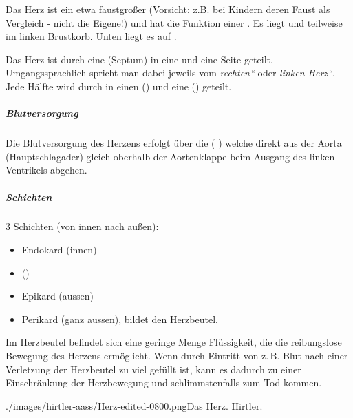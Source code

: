 {%
Das Herz ist ein etwa faustgroßer  (Vorsicht: z.B. bei Kindern
deren Faust als Vergleich - nicht die Eigene!) und hat die Funktion einer
. Es liegt 
 und teilweise im linken
Brustkorb. Unten liegt es auf .

 Das Herz ist durch eine  (Septum) in eine
 und eine  Seite geteilt.
Umgangssprachlich spricht man dabei jeweils vom
\emph{{\quotedblbase}rechten{\textquotedblleft}} oder
\emph{{\quotedblbase}linken Herz{\textquotedblleft}}. Jede
Hälfte wird durch  in einen 
() und eine  ()
geteilt.

\subparagraph{Blutversorgung}

Die Blutversorgung des Herzens erfolgt über die
  
(  ) welche direkt
aus der Aorta (Hauptschlagader) gleich oberhalb der Aortenklappe beim
Ausgang des linken Ventrikels abgehen.

\subparagraph{Schichten}

3 Schichten (von innen nach außen):
\begin{itemize}
\item Endokard (innen)      
\item {} ()  
\item Epikard (aussen)  
\item Perikard (ganz aussen), bildet den Herzbeutel.
\end{itemize}

\noindent Im Herzbeutel befindet sich eine geringe Menge Flüssigkeit, die die
reibungslose Bewegung des Herzens ermöglicht. Wenn durch Eintritt von z.\,B. Blut nach einer Verletzung der
Herzbeutel zu viel gefüllt ist, kann es dadurch zu einer Einschränkung der
Herzbewegung und schlimmstenfalls zum Tod kommen.
}{}{./images/hirtler-aass/Herz-edited-0800.png}{\AuthNotesPicLegalOk{}{}Das Herz.} {Hirtler.}

